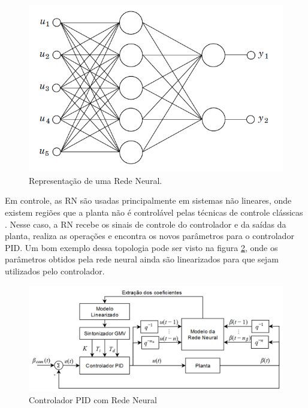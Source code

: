 \begin{figure}[H]
  \caption{Representação de uma Rede Neural.}
  \begin{center}
      \includegraphics[scale=0.5]{referencial/img/feedforward_neural_astrom_p297}
  \end{center}
  \label{fig:feedforward_neural_astrom_p297}
\end{figure}

Em controle, as RN são usadas principalmente em sistemas não lineares, onde existem regiões que a planta não é controlável pelas técnicas de controle clássicas . Nesse caso, a RN recebe os sinais de controle do controlador e da saídas da planta, realiza as operações e encontra os novos parâmetros para o controlador PID. Um bom exemplo dessa topologia pode ser visto na figura \ref{fig:pid_neural_chen_p212}, onde os parâmetros obtidos pela rede neural ainda são linearizados para que sejam utilizados pelo controlador.

\begin{figure}[H]
  \caption{Controlador PID com Rede Neural}
  \begin{center}
      \includegraphics[scale=0.55]{referencial/img/pid_neural_chen_p212}
  \end{center}
  \label{fig:pid_neural_chen_p212}
\end{figure}

